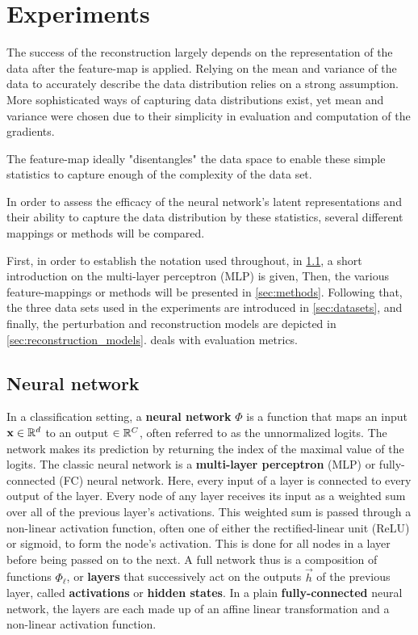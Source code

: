 
\chapter{Experiments}
\label{chap:Experiments} 

The success of the reconstruction largely depends on the representation of the data
after the feature-map is applied.
Relying on the mean and variance of the data to accurately describe the data distribution 
relies on a strong assumption.
More sophisticated ways of capturing data distributions exist, yet mean and variance were chosen due to their simplicity in evaluation and computation of the gradients.

The feature-map ideally "disentangles" the data space to enable 
these simple statistics to capture enough of the complexity of the data set.

In order to assess the efficacy of the neural network's latent representations 
and their ability to capture the data distribution by these statistics,
several different mappings or methods will be compared. 

First, in order to establish the notation used throughout, in \cref{sec:nn_def}, 
a short introduction on the multi-layer perceptron (MLP) is given,
Then, the various feature-mappings or methods will be presented in \cref{sec:methods}.
Following that, the three data sets used in the experiments are introduced in \cref{sec:datasets},
and finally, the perturbation and reconstruction models are depicted in \cref{sec:reconstruction_models}.
 deals with evaluation metrics.

\section{Neural network}
\label{sec:nn_def}

In a classification setting, a \textbf{neural network} $\Phi$ is a function that maps an input $\mathbf x \in \mathbb{R}^d$ to an output $\in \mathbb{R}^C$,
often referred to as the unnormalized logits. 
The network makes its prediction by returning the index of the maximal value of the logits.
The classic neural network is a \textbf{multi-layer perceptron} (MLP) or fully-connected (FC) neural network.
Here, every input of a layer is connected to every output of the layer.
Every node of any layer receives its input as a weighted sum over all of the previous layer's activations.
This weighted sum is passed through a non-linear activation function, often one of either the rectified-linear unit (ReLU) or sigmoid, to form the node's activation. 
This is done for all nodes in a layer before being passed on to the next.
A full network thus is a composition of functions $\Phi_\ell$, or \textbf{layers} that 
successively act on the outputs $\vec h$ of the previous layer, called \textbf{activations} or \textbf{hidden states}. 
In a plain \textbf{fully-connected} neural network, the layers are each made up of an affine linear transformation and a non-linear activation function.

